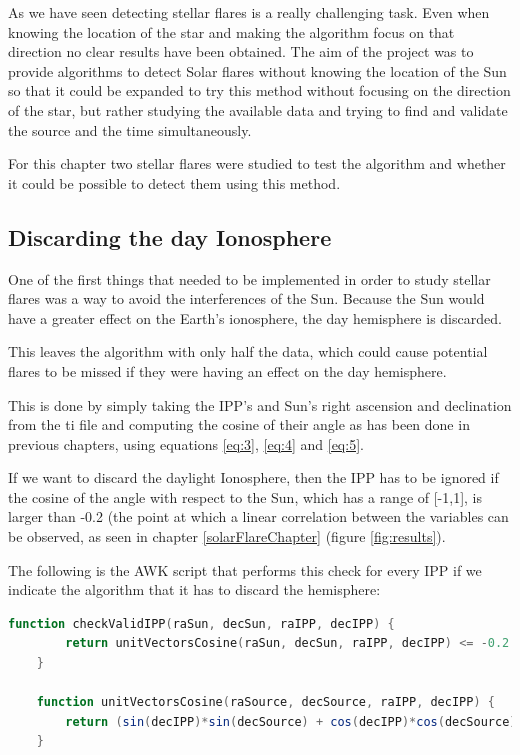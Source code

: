 As we have seen detecting stellar flares is a really challenging task. Even when knowing the location of the star and making the algorithm focus on that direction no clear results have been obtained. The aim of the project was to provide algorithms to detect Solar flares without knowing the location of the Sun so that it could be expanded to try this method without focusing on the direction of the star, but rather studying the available data and trying to find and validate the source and the time simultaneously.

For this chapter two stellar flares were studied to test the algorithm and whether it could be possible to detect them using this method.

\subsection{Discarding the day Ionosphere}

One of the first things that needed to be implemented in order to study stellar flares was a way to avoid the interferences of the Sun. Because the Sun would have a greater effect on the Earth's ionosphere, the day hemisphere is discarded.

This leaves the algorithm with only half the data, which could cause potential flares to be missed if they were having an effect on the day hemisphere.

This is done by simply taking the IPP's and Sun's right ascension and declination from the ti file and computing the cosine of their angle as has been done in previous chapters, using equations \ref{eq:3}, \ref{eq:4} and \ref{eq:5}.

If we want to discard the daylight Ionosphere, then the IPP has to be ignored if the cosine of the angle with respect to the Sun, which has a range of [-1,1], is larger than -0.2 (the point at which a linear correlation between the variables can be observed, as seen in chapter \ref{solarFlareChapter} (figure \ref{fig:results}).

The following is the AWK script that performs this check for every IPP if we indicate the algorithm that it has to discard the hemisphere:

\begin{minipage}{\linewidth}
	\begin{lstlisting}[language=awk, caption=Discarding the day hemisphere]
	function checkValidIPP(raSun, decSun, raIPP, decIPP) {
		return unitVectorsCosine(raSun, decSun, raIPP, decIPP) <= -0.2
	}
	
	function unitVectorsCosine(raSource, decSource, raIPP, decIPP) {
		return (sin(decIPP)*sin(decSource) + cos(decIPP)*cos(decSource)*cos(raIPP - raSource));
	}
\end{lstlisting}
\end{minipage}

